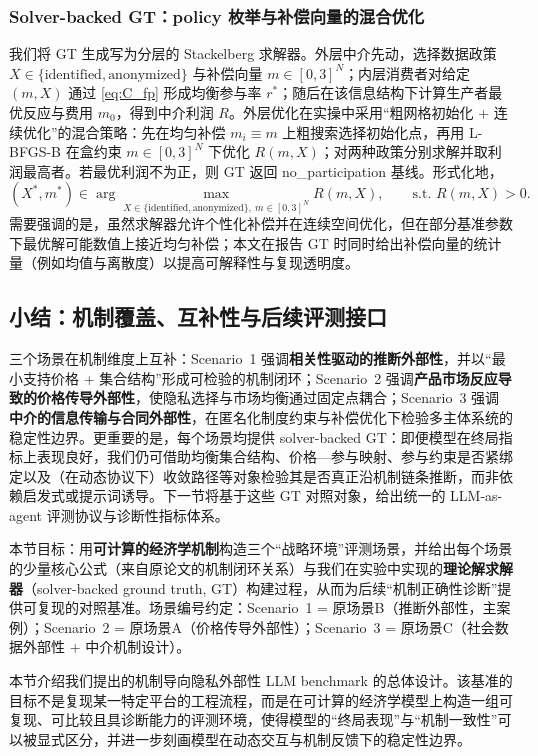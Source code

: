 \subsubsection{Solver-backed GT：policy 枚举与补偿向量的混合优化}
\label{subsubsec:C_solver}

我们将 GT 生成写为分层的 Stackelberg 求解器。外层中介先动，选择数据政策 $X\in\{\text{identified},\text{anonymized}\}$ 与补偿向量 $m\in[0,3]^N$；内层消费者对给定 $(m,X)$ 通过 \eqref{eq:C_fp} 形成均衡参与率 $r^{\ast}$；随后在该信息结构下计算生产者最优反应与费用 $m_0$，得到中介利润 $R$。外层优化在实操中采用“粗网格初始化 + 连续优化”的混合策略：先在均匀补偿 $m_i\equiv m$ 上粗搜索选择初始化点，再用 L-BFGS-B 在盒约束 $m\in[0,3]^N$ 下优化 $R(m,X)$；对两种政策分别求解并取利润最高者。若最优利润不为正，则 GT 返回 no\_participation 基线。形式化地，
\begin{equation}
(X^{\ast},m^{\ast}) \in \arg\max_{X\in\{\text{identified},\text{anonymized}\},\ m\in[0,3]^N} R(m,X),
\qquad \text{s.t. } R(m,X)>0.
\label{eq:C_outer}
\end{equation}
需要强调的是，虽然求解器允许个性化补偿并在连续空间优化，但在部分基准参数下最优解可能数值上接近均匀补偿；本文在报告 GT 时同时给出补偿向量的统计量（例如均值与离散度）以提高可解释性与复现透明度。

\subsection{小结：机制覆盖、互补性与后续评测接口}
\label{subsec:scenario_summary}

三个场景在机制维度上互补：Scenario~1 强调\textbf{相关性驱动的推断外部性}，并以“最小支持价格 + 集合结构”形成可检验的机制闭环；Scenario~2 强调\textbf{产品市场反应导致的价格传导外部性}，使隐私选择与市场均衡通过固定点耦合；Scenario~3 强调\textbf{中介的信息传输与合同外部性}，在匿名化制度约束与补偿优化下检验多主体系统的稳定性边界。更重要的是，每个场景均提供 solver-backed GT：即便模型在终局指标上表现良好，我们仍可借助均衡集合结构、价格—参与映射、参与约束是否紧绑定以及（在动态协议下）收敛路径等对象检验其是否真正沿机制链条推断，而非依赖启发式或提示词诱导。下一节将基于这些 GT 对照对象，给出统一的 LLM-as-agent 评测协议与诊断性指标体系。





\label{sec:mechanism_scenarios}

本节目标：用\textbf{可计算的经济学机制}构造三个“战略环境”评测场景，并给出每个场景的少量核心公式（来自原论文的机制闭环关系）与我们在实验中实现的\textbf{理论解求解器}（solver-backed ground truth, GT）构建过程，从而为后续“机制正确性诊断”提供可复现的对照基准。场景编号约定：Scenario~1 = 原场景B（推断外部性，主案例）；Scenario~2 = 原场景A（价格传导外部性）；Scenario~3 = 原场景C（社会数据外部性 + 中介机制设计）。






\label{sec:framework}

本节介绍我们提出的机制导向隐私外部性 LLM benchmark 的总体设计。该基准的目标不是复现某一特定平台的工程流程，而是在可计算的经济学模型上构造一组可复现、可比较且具诊断能力的评测环境，使得模型的“终局表现”与“机制一致性”可以被显式区分，并进一步刻画模型在动态交互与机制反馈下的稳定性边界。